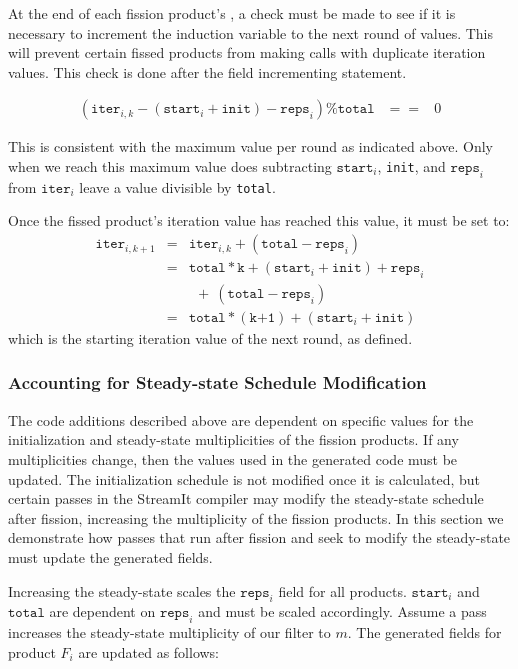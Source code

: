 At the end of each fission product's \work, a check must be made to
see if it is necessary to increment the induction variable to the next
round of values.  This will prevent certain fissed products from
making calls with duplicate iteration values.  This check is done
after the field incrementing statement.

\begin{eqnarray*}
(\texttt{iter}_{i,k} - (\texttt{start}_i + \texttt{init}) - \texttt{reps}_i) \% \texttt{total} &==& 0
\end{eqnarray*}

This is consistent with the maximum value per round as
indicated above.  Only when we reach this maximum value does subtracting 
$\texttt{start}_i$, \texttt{init}, and $\texttt{reps}_i$ from $\texttt{iter}_i$ leave a value divisible by
\texttt{total}.

Once the fissed product's iteration value has reached
this value, it must be set to:
\begin{eqnarray*}
\texttt{iter}_{i,k+1} &=& \texttt{iter}_{i,k} + (\texttt{total} - \texttt{reps}_i) \\
&=& \texttt{total}*\texttt{k} + (\texttt{start}_i + \texttt{init}) + \texttt{reps}_i \\
&&  \ \ +\ (\texttt{total} - \texttt{reps}_i) \\
&=& \texttt{total}*(\texttt{k+1}) + (\texttt{start}_i + \texttt{init})
\end{eqnarray*}
which is the starting iteration value of the next round, as defined.

\subsubsection{Accounting for Steady-state Schedule Modification}
\label{sec:ssmod}

The code additions described above are dependent on specific values
for the initialization and steady-state multiplicities of the fission
products. If any multiplicities change, then the values used in the
generated code must be updated. The initialization schedule is not
modified once it is calculated, but certain passes in the StreamIt
compiler may modify the steady-state schedule after fission,
increasing the multiplicity of the fission products.  In this section
we demonstrate how passes that run after fission and seek to
modify the steady-state must update the generated fields.

Increasing the steady-state scales the $\texttt{reps}_i$ field for all
products. $\texttt{start}_i$ and $\texttt{total}$ are dependent on
$\texttt{reps}_i$ and must be scaled accordingly. Assume a pass
increases the steady-state multiplicity of our filter to $m$. The
generated fields for product $F_i$ are updated as follows:

